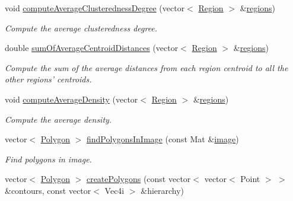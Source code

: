 \begin{DoxyCompactItemize}
void \hyperlink{classmultiscale_1_1analysis_1_1RegionDetector_a5ad71a8af2beb1a02573d0c125af4e16}{compute\-Average\-Clusteredness\-Degree} (vector$<$ \hyperlink{classmultiscale_1_1analysis_1_1Region}{Region} $>$ \&\hyperlink{classmultiscale_1_1analysis_1_1RegionDetector_aa6517ceb3a58295448d32e6e41499893}{regions})
\begin{DoxyCompactList}\small\item\em Compute the average clusteredness degree. \end{DoxyCompactList}\item 
double \hyperlink{classmultiscale_1_1analysis_1_1RegionDetector_a477a666686e68c996b4d525921df4121}{sum\-Of\-Average\-Centroid\-Distances} (vector$<$ \hyperlink{classmultiscale_1_1analysis_1_1Region}{Region} $>$ \&\hyperlink{classmultiscale_1_1analysis_1_1RegionDetector_aa6517ceb3a58295448d32e6e41499893}{regions})
\begin{DoxyCompactList}\small\item\em Compute the sum of the average distances from each region centroid to all the other regions' centroids. \end{DoxyCompactList}\item 
void \hyperlink{classmultiscale_1_1analysis_1_1RegionDetector_a3f1171daf4a952d12d573ab9d0838490}{compute\-Average\-Density} (vector$<$ \hyperlink{classmultiscale_1_1analysis_1_1Region}{Region} $>$ \&\hyperlink{classmultiscale_1_1analysis_1_1RegionDetector_aa6517ceb3a58295448d32e6e41499893}{regions})
\begin{DoxyCompactList}\small\item\em Compute the average density. \end{DoxyCompactList}\item 
vector$<$ \hyperlink{namespacemultiscale_1_1analysis_a37bc63d1d786b35968c450508f8bcbd3}{Polygon} $>$ \hyperlink{classmultiscale_1_1analysis_1_1RegionDetector_a43ef117cc15f29285251388c4bf4aeea}{find\-Polygons\-In\-Image} (const Mat \&\hyperlink{classmultiscale_1_1analysis_1_1Detector_a523830a6cfe409694ce8327c3c736fbd}{image})
\begin{DoxyCompactList}\small\item\em Find polygons in image. \end{DoxyCompactList}\item 
vector$<$ \hyperlink{namespacemultiscale_1_1analysis_a37bc63d1d786b35968c450508f8bcbd3}{Polygon} $>$ \hyperlink{classmultiscale_1_1analysis_1_1RegionDetector_a34c92fdd6421969f325bd9407d3a8601}{create\-Polygons} (const vector$<$ vector$<$ Point $>$ $>$ \&contours, const vector$<$ Vec4i $>$ \&hierarchy)

\end{DoxyCompactItemize}
